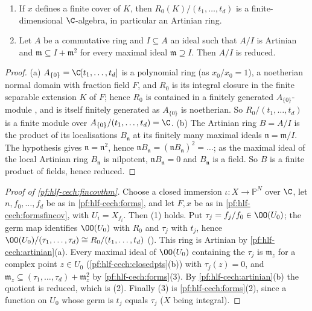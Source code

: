 \begin{lemma}\label{pf:hlf-cech:artinian}
\begin{enumerate}[label=(\alph*),nosep]
\item If $x$ defines a finite cover of $K$, then $R_0(K)/(t_1,\dots,t_d)$ is a finite-dimensional $\C$-algebra, in particular an Artinian ring.
\item Let $A$ be a commutative ring and $I\subseteq A$ an ideal such that $A/I$ is Artinian and $\mathfrak m\subseteq I+\mathfrak m^2$ for every
  maximal ideal $\mathfrak m\supseteq I$. Then $A/I$ is reduced.
\end{enumerate}
\end{lemma}

\begin{proof}
(a) $A_{\{0\}}=\C[t_1,\dots,t_d]$ is a polynomial ring (as $x_0/x_0=1$), a noetherian normal domain with fraction field $F$, and $R_0$ is its
integral closure in the finite separable extension $K$ of $F$; hence $R_0$ is contained in a finitely generated $A_{\{0\}}$-module \cite[Prop.~5.17]{AtiyahMacdonald1969}, and is itself finitely generated as $A_{\{0\}}$ is noetherian.
So $R_0/(t_1,\dots,t_d)$ is a finite module over $A_{\{0\}}/(t_1,\dots,t_d)=\C$.
(b) The Artinian ring $B=A/I$ is the product of its localisations $B_{\mathfrak n}$ at its finitely many maximal ideals $\mathfrak n=\mathfrak m/I$.
The hypothesis gives $\mathfrak n=\mathfrak n^2$, hence $\mathfrak nB_{\mathfrak n}=(\mathfrak nB_{\mathfrak n})^2=\dots$; as the maximal ideal of the
local Artinian ring $B_{\mathfrak n}$ is nilpotent, $\mathfrak nB_{\mathfrak n}=0$ and $B_{\mathfrak n}$ is a field. So $B$ is a finite product of
fields, hence reduced.
\end{proof}

\begin{proof}[Proof of \cref{pf:hlf-cech:fincovthm}]
Choose a closed immersion $\iota\colon X\to\mathbb P^N$ over $\C$, let $n,f_0,\dots,f_d$ be as in \cref{pf:hlf-cech:forms}, and let $F,x$ be as in
\cref{pf:hlf-cech:formsfincov}, with $U_i=X_{f_i}$. Then (1) holds. Put $\tau_j=f_j/f_0\in\OO(U_0)$; the germ map identifies $\OO(U_0)$ with
$R_0$ and $\tau_j$ with $t_j$, hence $\OO(U_0)/(\tau_1,\dots,\tau_d)\cong R_0/(t_1,\dots,t_d)$ ().
This ring is Artinian by \cref{pf:hlf-cech:artinian}(a). Every maximal ideal of $\OO(U_0)$ containing the $\tau_j$ is $\mathfrak m_z$ for a complex
point $z\in U_0$ (\cref{pf:hlf-cech:closedpts}(b)) with $\tau_j(z)=0$, and $\mathfrak m_z\subseteq(\tau_1,\dots,\tau_d)+\mathfrak m_z^2$ by
\cref{pf:hlf-cech:forms}(3). By \cref{pf:hlf-cech:artinian}(b) the quotient is reduced, which is (2). Finally (3) is \cref{pf:hlf-cech:forms}(2),
since a function on $U_0$ whose germ is $t_j$ equals $\tau_j$ ($X$ being integral).
\end{proof}

